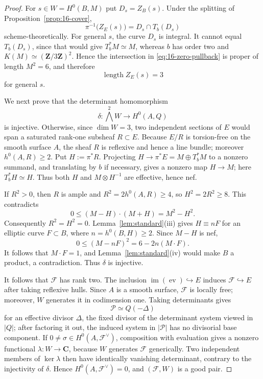 \documentclass[12pt]{amsart}
\numberwithin{equation}{section}
\theoremstyle{definition}
\theoremstyle{remark}
\newcommand{\Z}{\mathbf Z}
\begin{document}
\begin{proof}
For $s\in W=H^0(B,M)$ put $D_s=Z_B(s)$.  Under the splitting of
Proposition~\ref{prop:16-cover},
\begin{equation}\label{eq:16-zero-pullback}
 \pi^{-1}\bigl(Z_E(s)\bigr)=D_s\cap T_b(D_s)
\end{equation}
scheme-theoretically.  For general $s$, the curve $D_s$ is integral.  It
cannot equal $T_b(D_s)$, since that would give $T_b^*M\simeq M$, whereas
$b$ has order two and $K(M)\simeq(\Z/3\Z)^2$.  Hence the
intersection in \eqref{eq:16-zero-pullback} is proper of length $M^2=6$,
and therefore
\begin{equation}\label{eq:16-zero-length}
 \operatorname{length}Z_E(s)=3
\end{equation}
for general $s$.

We next prove that the determinant homomorphism
\[
 \delta:\bigwedge^2W\longrightarrow H^0(A,Q)
\]
is injective.  Otherwise, since $\dim W=3$, two independent sections of
$E$ would span a saturated rank-one subsheaf $R\subset E$.  Because
$E/R$ is torsion-free on the smooth surface $A$, the sheaf $R$ is
reflexive and hence a line bundle; moreover $h^0(A,R)\ge2$.  Put
$H:=\pi^*R$.  Projecting
$H\to\pi^*E=M\oplus T_b^*M$ to a nonzero summand, and translating by
$b$ if necessary, gives a nonzero map $H\to M$; here
$T_b^*H\simeq H$.  Thus both $H$ and $M\otimes H^{-1}$ are effective,
hence nef.

If $R^2>0$, then $R$ is ample and
$R^2=2h^0(A,R)\ge4$, so $H^2=2R^2\ge8$.  This contradicts
\[
 0\le (M-H)\cdot(M+H)=M^2-H^2.
\]
Consequently $R^2=H^2=0$.  Lemma~\ref{lem:standard}(iii) gives
$H\equiv nF$ for an elliptic curve $F\subset B$, where
$n=h^0(B,H)\ge2$.  Since $M-H$ is nef,
\[
 0\le(M-nF)^2=6-2n(M\cdot F).
\]
It follows that $M\cdot F=1$, and Lemma~\ref{lem:standard}(iv) would
make $B$ a product, a contradiction.  Thus $\delta$ is injective.

It follows that $\mathcal F$ has rank two.  The inclusion
$\operatorname{im}(\operatorname{ev})\hookrightarrow E$ induces
$\mathcal F\hookrightarrow E$ after taking reflexive hulls.  Since $A$
is a smooth surface, $\mathcal F$ is locally free; moreover, $W$
generates it in codimension one.  Taking determinants gives
\[
 \mathcal P\simeq Q(-\Delta)
\]
for an effective divisor $\Delta$, the fixed divisor of the determinant
system viewed in $|Q|$; after factoring it out, the induced system in
$|\mathcal P|$ has no divisorial base component.  If
$0\ne\sigma\in H^0(A,\mathcal F^\vee)$, composition with evaluation
gives a nonzero functional $\lambda:W\to\mathbf C$, because $W$
generates $\mathcal F$ generically.  Two
independent members of $\ker\lambda$ then have identically vanishing
determinant, contrary to the injectivity of $\delta$.  Hence
$H^0(A,\mathcal F^\vee)=0$, and $(\mathcal F,W)$ is a good pair.


\end{proof}
\end{document}
